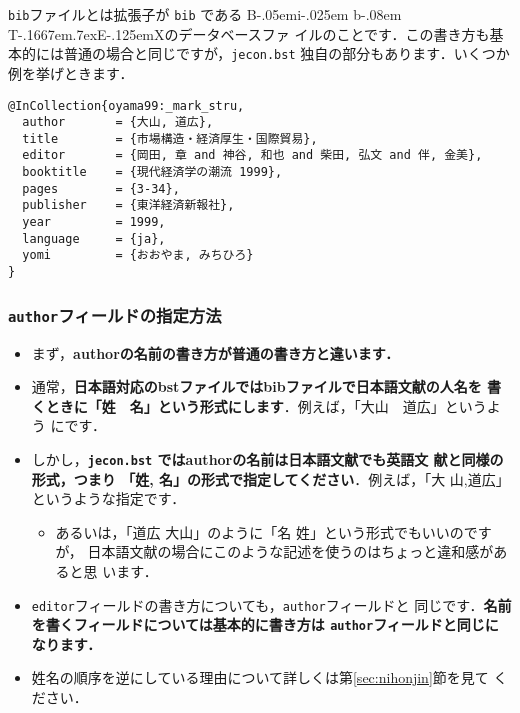 \documentclass[a4j,10pt]{jarticle}
\def\BibTeX{{\rm B\kern-.05em{\sc i\kern-.025em b}\kern-.08em
    T\kern-.1667em\lower.7ex\hbox{E}\kern-.125emX}}
\begin{document}
\texttt{bib}ファイルとは拡張子が \texttt{bib} である \BibTeX のデータベースファ
イルのことです．この書き方も基本的には普通の場合と同じですが，\texttt{jecon.bst}
独自の部分もあります．いくつか例を挙げときます．

\begin{screen}
 \begin{verbatim}
@InCollection{oyama99:_mark_stru,
  author       = {大山, 道広},
  title        = {市場構造・経済厚生・国際貿易},
  editor       = {岡田, 章 and 神谷, 和也 and 柴田, 弘文 and 伴, 金美},
  booktitle    = {現代経済学の潮流 1999},
  pages        = {3-34},
  publisher    = {東洋経済新報社},
  year         = 1999,
  language     = {ja},
  yomi         = {おおやま, みちひろ}
}
\end{verbatim}
\end{screen}

\subsubsection{\texttt{author}フィールドの指定方法}
\label{jecon-example-sec:author}

\begin{itemize}
 \item まず，\textbf{authorの名前の書き方が普通の書き方と違います．}
 \item 通常，\textbf{日本語対応のbstファイルではbibファイルで日本語文献の人名を
       書くときに「姓　名」という形式にします}．例えば，「大山　道広」というよう
       にです．
 \item しかし，\textbf{\texttt{jecon.bst} ではauthorの名前は日本語文献でも英語文
       献と同様の形式，つまり 「姓, 名」の形式で指定してください}．例えば，「大
       山,道広」というような指定です．
       \begin{itemize}
        \item あるいは，「道広 大山」のように「名 姓」という形式でもいいのですが，
              日本語文献の場合にこのような記述を使うのはちょっと違和感があると思
              います．
       \end{itemize}
 \item \texttt{editor}フィールドの書き方についても，\texttt{author}フィールドと
       同じです．\textbf{名前を書くフィールドについては基本的に書き方は
       \texttt{author}フィールドと同じになります．}
 \item 姓名の順序を逆にしている理由について詳しくは第\ref{sec:nihonjin}節を見て
       ください．
\end{itemize}
\end{document}
